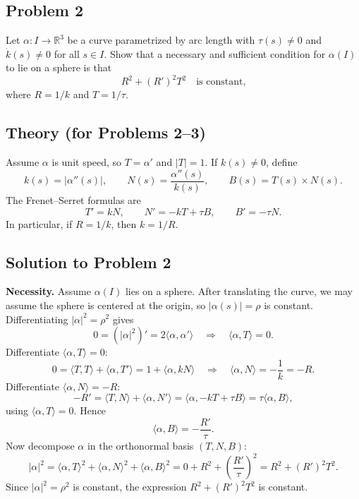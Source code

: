 \documentclass[12pt,a4paper]{article}
\theoremstyle{plain}
\theoremstyle{definition}      %
\begin{document}
	
	\subsection*{Problem 2}
	Let $\alpha:I\to\mathbb{R}^3$ be a curve parametrized by arc length with $\tau(s)\neq 0$ and $\dot{k}(s)\neq 0$
	for all $s\in I$. Show that a necessary and sufficient condition for $\alpha(I)$ to lie on a sphere is that
	\[
	R^2 + (R')^2 T^2
	\quad\text{is constant,}
	\]
	where $R=1/k$ and $T=1/\tau$.
	
	\subsection*{Theory (for Problems 2--3)}
	Assume $\alpha$ is unit speed, so $T=\alpha'$ and $|T|=1$. If $k(s)\neq 0$, define
	\[
	k(s)=|\alpha''(s)|,\qquad N(s)=\frac{\alpha''(s)}{k(s)},\qquad B(s)=T(s)\times N(s).
	\]
	The Frenet--Serret formulas are
	\[
	T'=kN,\qquad N'=-kT+\tau B,\qquad B'=-\tau N.
	\]
	In particular, if $R=1/k$, then $k=1/R$.
	
	\subsection*{Solution to Problem 2}
	
	\noindent\textbf{Necessity.}
	Assume $\alpha(I)$ lies on a sphere. After translating the curve, we may assume the sphere is centered at the origin,
	so $|\alpha(s)|=\rho$ is constant. Differentiating $|\alpha|^2=\rho^2$ gives
	\[
	0=(|\alpha|^2)'=2\langle \alpha,\alpha'\rangle
	\quad\Longrightarrow\quad
	\langle \alpha,T\rangle=0.
	\]
	Differentiate $\langle \alpha,T\rangle=0$:
	\[
	0=\langle T,T\rangle+\langle \alpha,T'\rangle
	=1+\langle \alpha,kN\rangle
	\quad\Longrightarrow\quad
	\langle \alpha,N\rangle=-\frac{1}{k}=-R.
	\]
	Differentiate $\langle \alpha,N\rangle=-R$:
	\[
	-R'=\langle T,N\rangle+\langle \alpha,N'\rangle
	=\langle \alpha,-kT+\tau B\rangle
	=\tau\langle \alpha,B\rangle,
	\]
	using $\langle \alpha,T\rangle=0$. Hence
	\[
	\langle \alpha,B\rangle=-\frac{R'}{\tau}.
	\]
	Now decompose $\alpha$ in the orthonormal basis $(T,N,B)$:
	\[
	|\alpha|^2=\langle \alpha,T\rangle^2+\langle \alpha,N\rangle^2+\langle \alpha,B\rangle^2
	=0+R^2+\left(\frac{R'}{\tau}\right)^2
	=R^2+(R')^2T^2.
	\]
	Since $|\alpha|^2=\rho^2$ is constant, the expression $R^2+(R')^2T^2$ is constant.
	
\end{document}
